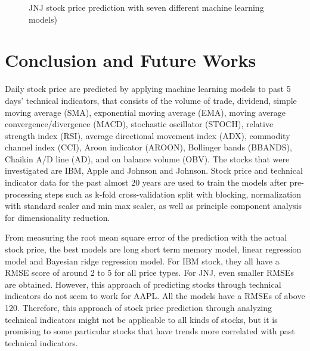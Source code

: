 \documentclass[conference]{IEEEtran}
\begin{document}
\begin{figure}
	\caption{JNJ stock price prediction with seven different machine learning models)}
	\label{figure:JNJ_RMSE_prediction}
\end{figure}


\section{Conclusion and Future Works}

Daily stock price are predicted by applying machine learning models to past 5 days' technical indicators, that consists of the volume of trade, dividend, simple moving average (SMA), exponential moving average (EMA), moving average convergence/divergence (MACD), stochastic oscillator (STOCH), relative strength index (RSI), average directional movement index (ADX), commodity channel index (CCI), Aroon indicator (AROON), Bollinger bands (BBANDS), Chaikin A/D line (AD), and on balance volume (OBV). The stocks that were investigated are IBM, Apple and Johnson and Johnson. Stock price and technical indicator data for the past almost 20 years are used to train the models after pre-processing steps such as k-fold cross-validation split with blocking, normalization with standard scaler and min max scaler, as well as principle component analysis for dimensionality reduction.

From measuring the root mean square error of the prediction with the actual stock price, the best models are long short term memory model, linear regression model and Bayesian ridge regression model. For IBM stock, they all have a RMSE score of around 2 to 5 for all price types. For JNJ, even smaller RMSEs are obtained. However, this approach of predicting stocks through technical indicators do not seem to work for AAPL. All the models have a RMSEs of above 120. Therefore, this approach of stock price prediction through analyzing technical indicators might not be applicable to all kinds of stocks, but it is promising to some particular stocks that have trends more correlated with past technical indicators.
\end{document}
